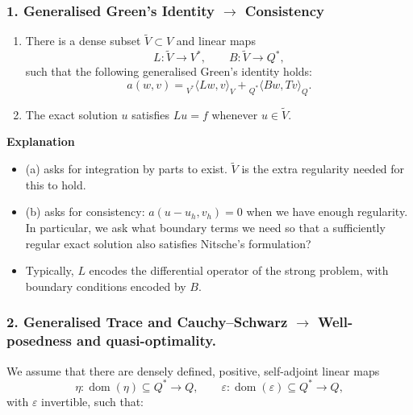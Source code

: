 \documentclass[11pt,a4paper]{article}
\begin{document}
\subsubsection*{1. Generalised Green's Identity $\longrightarrow$ Consistency}

\begin{enumerate}[label=(\alph*)]
    \item There is a dense subset $\widetilde V\subset V$ and linear maps
    \[
        L:\widetilde V\to V^*,\qquad B:\widetilde V\to Q^*,
    \]
    such that the following generalised Green's identity holds:
    \[
        a(w,v)={}_{V^*}\langle Lw,v\rangle_V
                 +{}_{Q^*}\langle Bw,Tv\rangle_Q.
    \]

    \item The exact solution $u$ satisfies $Lu=f$ whenever $u\in\widetilde V$.
\end{enumerate}

\textbf{Explanation}

\begin{itemize}
    \item (a) asks for integration by parts to exist. $\widetilde V$ is the extra regularity needed for this to hold.

    \item (b) asks for consistency: $a(u-u_h,v_h)=0$ when we have enough regularity. In particular, we ask what boundary terms we need so that a sufficiently regular exact solution also satisfies Nitsche's formulation? 

    \item Typically, $L$ encodes the differential operator of the strong problem, with boundary conditions encoded by $B$.
\end{itemize}

\subsubsection*{2. Generalised Trace and Cauchy--Schwarz $\longrightarrow$ Well-posedness and quasi-optimality.}

We assume that there are densely defined, positive, self-adjoint linear maps
\[
    \eta:\operatorname{dom}(\eta)\subseteq Q^*\to Q,
    \qquad
    \varepsilon:\operatorname{dom}(\varepsilon)\subseteq Q^*\to Q,
\]
with $\varepsilon$ invertible, such that:
\end{document}
